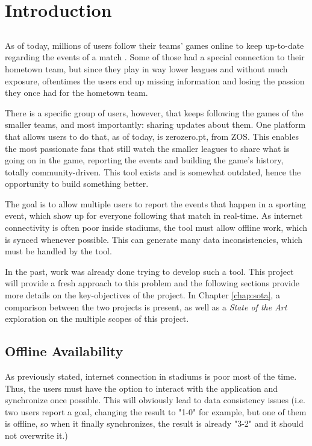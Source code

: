 \chapter{Introduction} \label{chap:intro}

\section*{}

As of today, millions of users follow their teams' games online to keep up-to-date regarding the events of a match \cite{kn:facebook-livestream-stats}. Some of those had a special connection to their hometown team, but since they play in way lower leagues and without much exposure, oftentimes the users end up missing information and losing the passion they once had for the hometown team.

There is a specific group of users, however, that keeps following the games of the smaller teams, and most importantly: sharing updates about them. One platform that allows users to do that, as of today, is zerozero.pt, from ZOS. This enables the most passionate fans that still watch the smaller leagues to share what is going on in the game, reporting the events and building the game's history, totally community-driven. This tool exists and is somewhat outdated, hence the opportunity to build something better.

The goal is to allow multiple users to report the events that happen in a sporting event, which show up for everyone following that match in real-time. As internet connectivity is often poor inside stadiums, the tool must allow offline work, which is synced whenever possible. This can generate many data inconsistencies, which must be handled by the tool.

In the past, work was already done trying to develop such a tool. This project will provide a fresh approach to this problem and the following sections provide more details on the key-objectives of the project. In Chapter \ref{chap:sota}, a comparison between the two projects is present, as well as a \textit{State of the Art} exploration on the multiple scopes of this project.

\section{Offline Availability} \label{sec:offline-avail-intro}

As previously stated, internet connection in stadiums is poor most of the time. Thus, the users must have the option to interact with the application and synchronize once possible. This will obviously lead to data consistency issues (i.e. two users report a goal, changing the result to "1-0" for example, but one of them is offline, so when it finally synchronizes, the result is already "3-2" and it should not overwrite it.)

